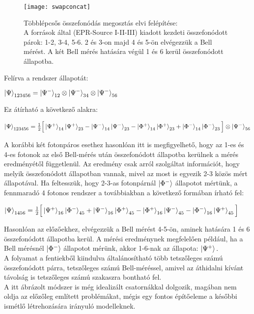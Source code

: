 \begin{figure}[H]
\centering
\texttt{[image: swapconcat]}
\caption[Összefonódás megosztások összefűzése]{Többlépcsős összefonódás megosztás elvi felépítése:\\
A források által (EPR-Source I-II-III) kiadott kezdeti összefonódott párok: 1-2, 3-4, 5-6. 2 és 3-on majd 4 és 5-ön elvégezzük a Bell mérést. A két Bell mérés hatására végül 1 és 6 kerül összefonódott állapotba.}
\end{figure}

Felírva a rendszer állapotát:
\begin{center}
$ \ket{\Psi}_{123456}= \ket{\Psi^-}_{12} \otimes \ket{\Psi^-}_{34} \otimes \ket{\Psi^-}_{56} $
\end{center}
Ez átírható a következő alakra:
\begin{center}
$ \ket{\Psi}_{123456} = \frac{1}{2} \Big[ \ket{\Psi^+}_{14}\ket{\Psi^+}_{23}-\ket{\Psi^-}_{14}\ket{\Psi^-}_{23}-\ket{\Phi^+}_{14}\ket{\Phi^+}_{23} + \ket{\Phi^-}_{14}\ket{\Phi^-}_{23} \Big] \otimes \ket{\Psi^-}_{56} $
\end{center}
A korábbi két fotonpáros esethez hasonlóan itt is megfigyelhető, hogy az 1-es és 4-es fotonok az első Bell-mérés után összefonódott állapotba kerülnek a mérés eredményétől függetlenül. Az eredmény csak arról szolgáltat információt, hogy melyik összefonódott állapotban vannak, mivel az most is egyezik 2-3 közös mért állapotával.
Ha feltesszük, hogy 2-3-as fotonpárnál $ \ket{\Phi^-} $   állapotot mértünk, a fennmaradó 4 fotonos rendszer a továbbiakban a következő formában írható fel:
\begin{center}
$ \ket{\Psi}_{1456} = \frac{1}{2}\Big[ \ket{\Psi^+}_{16}\ket{\Phi^-}_{45}+\ket{\Psi^-}_{16}\ket{\Phi^+}_{45} - \ket{\Phi^+}_{16}\ket{\Psi^-}_{45} - \ket{\Phi^-}_{16}\ket{\Psi^+}_{45} \Big] $
\end{center}
Hasonlóan az előzőekhez, elvégezzük a Bell mérést 4-5-ön, aminek hatására 1 és 6 összefonódott állapotba kerül. A mérési eredménynek megfelelően például, ha a Bell mérésnél $\ket{\Phi^-} $ állapotot mérünk, akkor 1-6-nak az állapota: $ \ket{\Psi^+} . $ \\
A folyamat a fentiekből kiindulva általánosítható több tetszőleges számú összefonódott párra, tetszőleges számú Bell-méréssel, amivel az áthidalni kívánt távolság is tetszőleges számú szakaszra bontható fel.\\
A itt ábrázolt módszer is még idealizált csatornákkal dolgozik, magában nem oldja az előzőleg említett problémákat, mégis egy fontos építőeleme a későbbi ismétlő létrehozására irányuló modelleknek.
